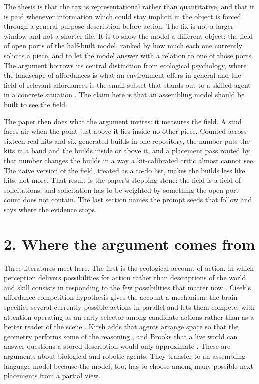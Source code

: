 \documentclass[11pt,a4paper]{article}
\begin{document}
The thesis is that the tax is representational rather than quantitative, and that it is paid whenever information which could stay implicit in the object is forced through a general-purpose description before action. The fix is not a larger window and not a shorter file. It is to show the model a different object: the field of open ports of the half-built model, ranked by how much each one currently solicits a piece, and to let the model answer with a relation to one of those ports. The argument borrows its central distinction from ecological psychology, where the landscape of affordances is what an environment offers in general and the field of relevant affordances is the small subset that stands out to a skilled agent in a concrete situation \cite{vandijk2017foregrounding}. The claim here is that an assembling model should be built to see the field.

The paper then does what the argument invites: it measures the field. A stud faces air when the point just above it lies inside no other piece. Counted across sixteen real kits and six generated builds in one repository, the number puts the kits in a band and the builds inside or above it, and a placement pass routed by that number changes the builds in a way a kit-calibrated critic almost cannot see. The naive version of the field, treated as a to-do list, makes the builds less like kits, not more. That result is the paper's stepping stone: the field is a field of solicitations, and solicitation has to be weighted by something the open-port count does not contain. The last section names the prompt seeds that follow and says where the evidence stops.

\section*{2. Where the argument comes from}
Three literatures meet here. The first is the ecological account of action, in which perception delivers possibilities for action rather than descriptions of the world, and skill consists in responding to the few possibilities that matter now \cite{vandijk2017foregrounding}. Cisek's affordance competition hypothesis gives the account a mechanism: the brain specifies several currently possible actions in parallel and lets them compete, with attention operating as an early selector among candidate actions rather than as a better reader of the scene \cite{cisek2007affordance}. Kirsh adds that agents arrange space so that the geometry performs some of the reasoning \cite{kirsh1995space}, and Brooks that a live world can answer questions a stored description would only approximate \cite{brooks1991intelligence}. These are arguments about biological and robotic agents. They transfer to an assembling language model because the model, too, has to choose among many possible next placements from a partial view.
\end{document}
